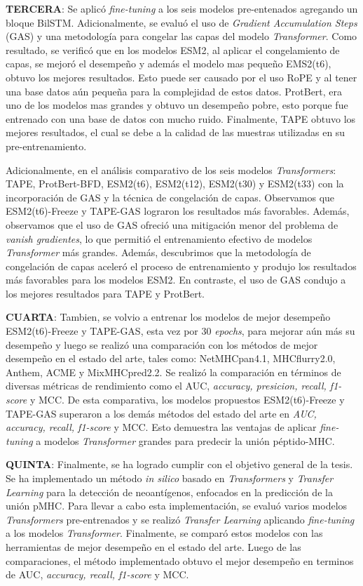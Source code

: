 \textbf{TERCERA}: Se aplicó \textit{fine-tuning} a los seis modelos pre-entenados agregando un bloque BilSTM. Adicionalmente, se evaluó el uso de \textit{Gradient Accumulation Steps} (GAS) y una metodología para congelar las capas del modelo \textit{Transformer}. Como resultado, se verificó que en los modelos ESM2, al aplicar el congelamiento de capas, se mejoró el desempeño y además el modelo mas pequeño EMS2(t6), obtuvo los mejores resultados. Esto puede ser causado por el uso RoPE y al tener una base datos aún pequeña para la complejidad de estos datos. ProtBert, era uno de los modelos mas grandes y obtuvo un desempeño pobre, esto porque fue entrenado con una base de datos con mucho ruido. Finalmente, TAPE obtuvo los mejores resultados, el cual se debe a la calidad de las muestras utilizadas en su pre-entrenamiento.


Adicionalmente, en el análisis comparativo de los seis modelos \textit{Transformers}: TAPE, ProtBert-BFD, ESM2(t6), ESM2(t12), ESM2(t30) y ESM2(t33) con la incorporación de GAS y la técnica de congelación de capas. Observamos que ESM2(t6)-Freeze y TAPE-GAS lograron los resultados más favorables. Además, observamos que el uso de GAS ofreció una mitigación menor del problema de \textit{vanish gradientes}, lo que permitió el entrenamiento efectivo de modelos \textit{Transformer} más grandes. Además, descubrimos que la metodología de congelación de capas aceleró el proceso de entrenamiento y produjo los resultados más favorables para los modelos ESM2. En contraste, el uso de GAS condujo a los mejores resultados para TAPE y ProtBert.

\textbf{CUARTA}: Tambien, se volvio a entrenar los modelos de mejor desempeño ESM2(t6)-Freeze y TAPE-GAS, esta vez por 30 \textit{epochs}, para mejorar aún más su desempeño y luego se realizó una comparación con los métodos de mejor desempeño en el estado del arte, tales como: NetMHCpan4.1, MHCflurry2.0, Anthem, ACME y MixMHCpred2.2. Se realizó la comparación en términos de diversas métricas de rendimiento como el AUC, \textit{accuracy, presicion, recall, f1-score} y MCC. De esta comparativa, los modelos propuestos ESM2(t6)-Freeze y TAPE-GAS superaron a los demás métodos del estado del arte en \textit{AUC, accuracy, recall, f1-score} y MCC. Esto demuestra las ventajas de aplicar \textit{fine-tuning} a modelos \textit{Transformer} grandes para predecir la unión péptido-MHC.



\textbf{QUINTA}: Finalmente, se ha logrado cumplir con el objetivo general de la tesis. Se ha implementado un método  \textit{in silico} basado en \textit{Transformers} y \textit{Transfer Learning} para la detección de neoantígenos, enfocados en la predicción de la unión pMHC. Para llevar a cabo esta implementación, se evaluó varios modelos \textit{Transformers} pre-entrenados y se realizó \textit{Transfer Learning} aplicando \textit{fine-tuning} a los modelos \textit{Transformer}. Finalmente, se comparó estos modelos con las herramientas de mejor desempeño en el estado del arte. Luego de las comparaciones, el método implementado obtuvo el mejor desempeño en terminos de AUC, \textit{accuracy, recall, f1-score} y MCC.


